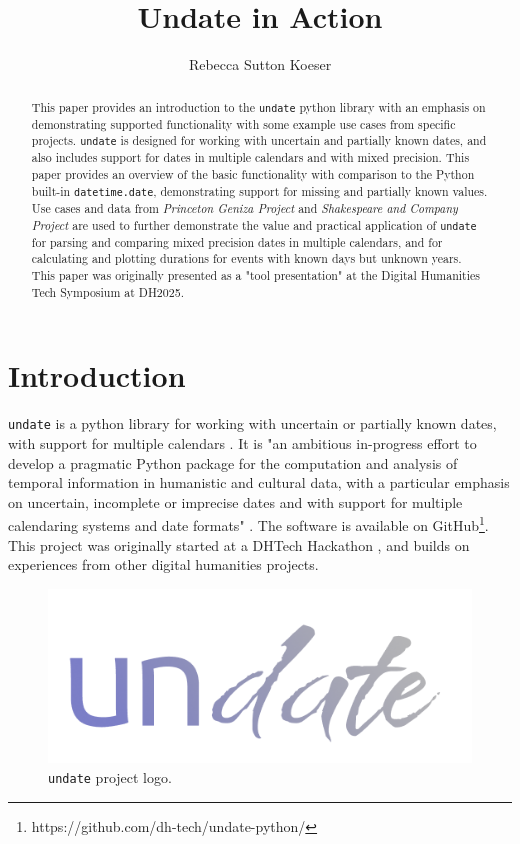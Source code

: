\documentclass{anthology-ch}         %
\title{Undate in Action}
\author[1]{Rebecca Sutton Koeser}[
  orcid=0000-0002-8762-8057
]
\affiliation{1}{Center for Digital Humanities, Princeton University, Princeton, New Jersey, USA}
\begin{document}
\maketitle

\begin{abstract}
This paper provides an introduction to the \texttt{undate} python library with an emphasis on demonstrating supported functionality with some example use cases from specific projects. \texttt{undate} is designed for working with uncertain and partially known dates, and also includes support for dates in multiple calendars and with mixed precision. This paper provides an overview of the basic functionality with comparison to the Python built-in \texttt{datetime.date}, demonstrating support for missing and partially known values. Use cases and data from \textit{Princeton Geniza Project} and \textit{Shakespeare and Company Project} are used to further demonstrate the value and practical application of \texttt{undate} for parsing and comparing mixed precision dates in multiple calendars, and for calculating and plotting durations for events with known days but unknown years. This paper was originally presented as a "tool presentation" at the Digital Humanities Tech Symposium at DH2025.
\end{abstract}

\section{Introduction} 

\texttt{undate} is a python library for working with uncertain or partially known dates, with support for multiple calendars \cite{koeser_undate_2025}. It is "an ambitious in-progress effort to develop a pragmatic Python package for the computation and analysis of temporal information in humanistic and cultural data, with a particular emphasis on uncertain, incomplete or imprecise dates and with support for multiple calendaring systems and date formats" \cite{koeser_princeton_2025}. The software is available on GitHub\footnote{https://github.com/dh-tech/undate-python/}. This project was originally started at a DHTech Hackathon \cite{koeser_join_2023}, and builds on experiences from other digital humanities projects.

\begin{figure}[h]
  \centering
  \includegraphics[width=0.4\linewidth]{assets/undate_logo.png}
  \caption{\texttt{undate} project logo.}
  \label{fig:logo}
\end{figure}
\end{document}
